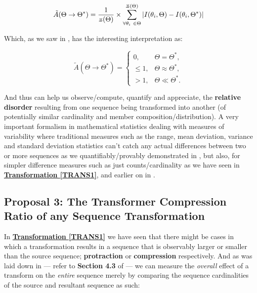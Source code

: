 \documentclass[12pt,a4paper]{article}
\newcommand{\invpi}[1]{\mathop{\rotatebox[origin=c]{180}{$\pi$}}#1}
\begin{document}
\begin{equation}
\tilde{A}(\Theta \rightarrow \Theta^*) = \frac{1}{\invpi(\Theta)} \times \sum\limits_{\forall \theta_i \ \in \Theta}^{\invpi(\Theta)} | I(\theta_i,\Theta) - I(\theta_i,\Theta^*)|
\end{equation} 

Which, as we saw in \cite{adtpaper}, has the interesting interpretation as:


\begin{equation}
\label{EQTHET}
\tilde{A}(\Theta \rightarrow \Theta^*) = \begin{cases}
0, & \Theta = \Theta^*, \\
\leq 1, & \Theta \approx \Theta^*, \\
> 1, & \Theta \ll \Theta^*.
\end{cases}
\end{equation}

And thus can help us observe/compute, quantify and appreciate, the \textbf{relative disorder} resulting from one sequence being transformed into another (of potentially similar cardinality and member composition/distribution). A very important formalism in mathematical statistics dealing with measures of variability where traditional measures such as the range, mean deviation,
variance and standard deviation statistics can't catch any actual differences between two or more sequences as we quantifiably/provably demonstrated in \cite{transformatics}, but also, for simpler difference measures such as just counts/cardinality as we have seen in \textbf{\hyperref[TRANS1]{Transformation \ref{TRANS1}}}, and earlier on in \cite{lutalo_2025_trans_genetics}.


\subsection{Proposal 3: The Transformer Compression Ratio of any Sequence Transformation\cite{transformatics}}

In  \textbf{\hyperref[TRANS1]{Transformation \ref{TRANS1}}} we have seen that there might be cases in which a transformation results in a sequence that is observably larger or smaller than the source sequence; \textbf{protraction} or \textbf{compression} respectively. And as was laid down in \cite{transformatics} --- refer to \textbf{Section 4.3} of \cite{transformatics} --- we can measure the \textit{overall} effect of a transform on the \textit{entire} sequence merely by comparing the sequence cardinalities of the source and resultant sequence as such:\\
\end{document}
